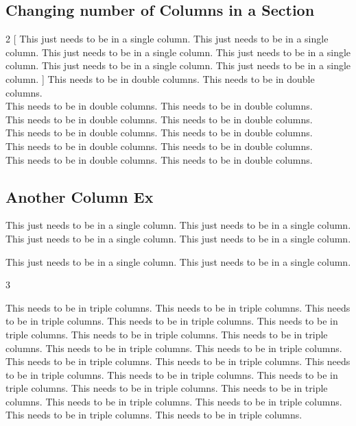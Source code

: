 \documentclass[12pt,twoside,a4paper]{article}
\begin{document}
\newpage

\subsection*{Changing number of Columns in a Section}
\begin{multicols}{2}
  [
This just needs to be in a single column. This just needs to be in a single column. This just needs to be in a single column. This just needs to be in a single column. This just needs to be in a single column. This just needs to be in a single column.
]
\noindent This needs to be in double columns. This needs to be in double columns.
\\This needs to be in double columns. This needs to be in double columns.
\\This needs to be in double columns. This needs to be in double columns.
\\This needs to be in double columns. This needs to be in double columns.
\\This needs to be in double columns. This needs to be in double columns.
\\This needs to be in double columns. This needs to be in double columns.

\end{multicols}

\subsection*{Another Column Ex}
\par This just needs to be in a single column. This just needs to be in a single column. This just needs to be in a single column. This just needs to be in a single column. \par This just needs to be in a single column. This just needs to be in a single column.

\begin{multicols}{3}
  \setlength{\columnsep}{0.5cm}
  \setlength{\columnseprule}{0pt} %

  This needs to be in triple columns. This needs to be in triple columns. This needs to be in triple columns. This needs to be in triple columns. This needs to be in triple columns. This needs to be in triple columns.
  \newline This needs to be in triple columns. This needs to be in triple columns.
  \newline This needs to be in triple columns. This needs to be in triple columns.
  \newline This needs to be in triple columns. This needs to be in triple columns.
  \newline This needs to be in triple columns. This needs to be in triple columns.
  \newline This needs to be in triple columns. This needs to be in triple columns.
  \newline This needs to be in triple columns. This needs to be in triple columns.
  \newline This needs to be in triple columns. This needs to be in triple columns.
\end{multicols}
\end{document}

